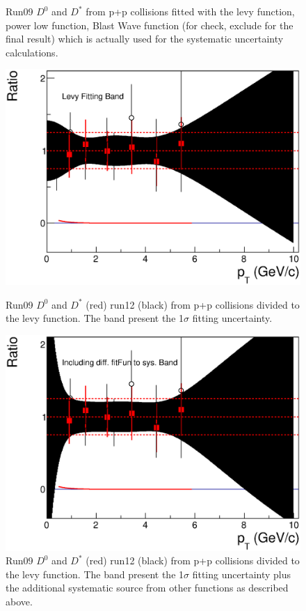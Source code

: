 \begin{figure}[htbp]
\begin{minipage}[htbp]{0.47\linewidth}
\caption{Run09 $D^{0}$ and $D^*$ from p+p collisions fitted with the levy function, power low function, Blast Wave function (for check, exclude for the final result) which is actually used for the systematic uncertainty calculations. \label{pp_baseLine2}}
\end{minipage}
\end{figure}

\begin{figure}[htbp]
\begin{minipage}[htbp]{0.47\linewidth}
\centering
\includegraphics[width=1.0\textwidth,angle=0]{figure/Run14_D0HFT/pp_baseLine_Ratio.eps}
\caption{Run09 $D^{0}$ and $D^*$ (red) run12 (black) from p+p collisions divided to the levy function. The band present the 1$\sigma$ fitting uncertainty. \label{pp_baseLine_ratio}}
\end{minipage}
\hfill
\begin{minipage}[htbp]{0.47\linewidth}
\centering
\includegraphics[width=1.0\textwidth,angle=0]{figure/Run14_D0HFT/pp_baseLine_Ratio3.eps}
\caption{Run09 $D^{0}$ and $D^*$ (red) run12 (black) from p+p collisions divided to the levy function. The band present the 1$\sigma$ fitting uncertainty plus the additional systematic source from other functions as described above. \label{pp_baseLine_ratio_3}}
\end{minipage}
\end{figure}

